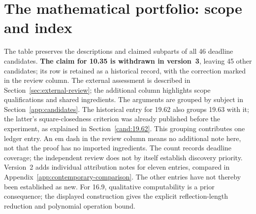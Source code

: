 \section{The mathematical portfolio: scope and index}
\label{app:inventory}
The table preserves the descriptions and claimed subparts of all 46
deadline candidates. \textbf{The claim for 10.35 is withdrawn in version~3},
leaving 45 other candidates; its row is retained as a historical record,
with the correction marked in the review column. The external assessment
is described in Section~\ref{sec:external-review}; the additional column
highlights scope qualifications and shared ingredients. The arguments
are grouped by subject in Section~\ref{app:candidates}. The historical entry for 19.62
also groups 19.63 with it; the latter's square-closedness criterion was
already published before the experiment, as explained in
Section~\ref{cand:19.62}. This grouping contributes one ledger entry.
An em dash in the review column means no additional note here, not that
the proof has no imported ingredients. The count records deadline coverage;
the independent review does not by itself establish discovery priority.
Version~2 adds individual attribution notes for eleven entries, compared
in Appendix~\ref{app:contemporary-comparison}. The other entries have not
thereby been established as new. For 16.9, qualitative computability is
a prior consequence; the displayed construction gives the explicit
reflection-length reduction and polynomial operation bound.


